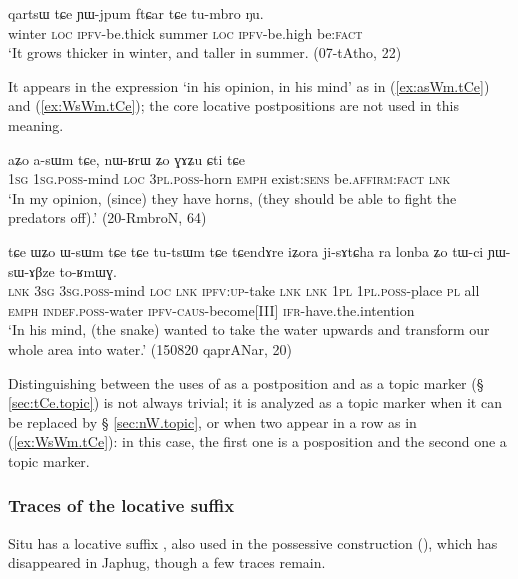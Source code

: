 \begin{exe}
\ex \label{ex:qartsW.tCe.YWjpum}
\gll qartsɯ tɕe ɲɯ-jpum ftɕar tɕe tu-mbro ŋu. \\
winter \textsc{loc} \textsc{ipfv}-be.thick summer \textsc{loc} \textsc{ipfv}-be.high be:\textsc{fact} \\
\glt `It grows thicker in winter, and taller in summer. (07-tAtho, 22)
\end{exe}

It appears in the expression  `in his opinion, in his mind' as in (\ref{ex:asWm.tCe}) and (\ref{ex:WsWm.tCe}); the core locative postpositions are not used in this meaning.

\begin{exe}
\ex \label{ex:asWm.tCe}
\gll aʑo a-sɯm tɕe, nɯ-ʁrɯ ʑo ɣɤʑu ɕti tɕe \\
\textsc{1sg} \textsc{1sg}.\textsc{poss}-mind \textsc{loc} \textsc{3pl}.\textsc{poss}-horn \textsc{emph} exist:\textsc{sens} be.\textsc{affirm}:\textsc{fact} \textsc{lnk} \\
\glt `In my opinion, (since) they have horns, (they should be able to fight the predators off).' (20-RmbroN, 64)
\end{exe}


\begin{exe}
\ex \label{ex:WsWm.tCe}
\gll 
tɕe ɯʑo ɯ-sɯm tɕe tɕe tu-tsɯm tɕe tɕendɤre iʑora ji-sɤtɕha ra lonba ʑo tɯ-ci ɲɯ-sɯ-ɤβze to-ʁmɯɣ. \\
\textsc{lnk} \textsc{3sg} \textsc{3sg}.\textsc{poss}-mind \textsc{loc} \textsc{lnk} \textsc{ipfv}:\textsc{up}-take \textsc{lnk} \textsc{lnk} \textsc{1pl} \textsc{1pl}.\textsc{poss}-place \textsc{pl} all \textsc{emph} \textsc{indef}.\textsc{poss}-water \textsc{ipfv}-\textsc{caus}-become[III] \textsc{ifr}-have.the.intention \\
\glt `In his mind, (the snake) wanted to take the water upwards and transform our whole area into water.' (150820 qaprANar, 20)
\end{exe} 

Distinguishing between the uses of  as a postposition and as a topic marker (§ \ref{sec:tCe.topic}) is not always trivial; it is analyzed as a topic marker when it can be replaced by  § \ref{sec:nW.topic}, or when two  appear in a row as in (\ref{ex:WsWm.tCe}): in this case, the first one is a posposition and the second one a topic marker.


\subsubsection{Traces of the locative suffix } \label{sec:locative.j}
Situ has a locative suffix , also used in the possessive construction (\citealt[325-330]{linxr93jiarongen}), which has disappeared in Japhug, though a few traces remain.

